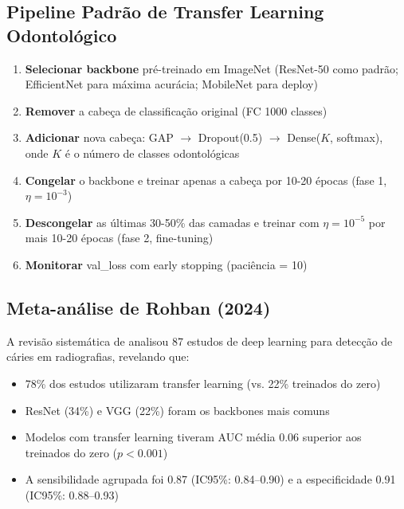 \subsection{Pipeline Padrão de Transfer Learning Odontológico}

\begin{enumerate}
  \item \textbf{Selecionar backbone} pré-treinado em ImageNet (ResNet-50 como
        padrão; EfficientNet para máxima acurácia; MobileNet para deploy)
  \item \textbf{Remover} a cabeça de classificação original (FC 1000 classes)
  \item \textbf{Adicionar} nova cabeça: GAP $\to$ Dropout(0.5) $\to$
        Dense($K$, softmax), onde $K$ é o número de classes odontológicas
  \item \textbf{Congelar} o backbone e treinar apenas a cabeça por 10-20 épocas
        (fase 1, $\eta = 10^{-3}$)
  \item \textbf{Descongelar} as últimas 30-50\% das camadas e treinar com
        $\eta = 10^{-5}$ por mais 10-20 épocas (fase 2, fine-tuning)
  \item \textbf{Monitorar} val\_loss com early stopping (paciência = 10)
\end{enumerate}


\subsection{Meta-análise de Rohban (2024)}

A revisão sistemática de  analisou 87 estudos de deep
learning para detecção de cáries em radiografias, revelando que:

\begin{itemize}
  \item 78\% dos estudos utilizaram transfer learning (vs. 22\% treinados do zero)
  \item ResNet (34\%) e VGG (22\%) foram os backbones mais comuns
  \item Modelos com transfer learning tiveram AUC média 0.06 superior aos
        treinados do zero ($p < 0.001$)
  \item A sensibilidade agrupada foi 0.87 (IC95\%: 0.84--0.90) e a especificidade
        0.91 (IC95\%: 0.88--0.93)
\end{itemize}

